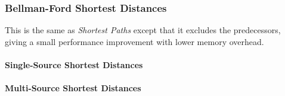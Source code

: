 \subsubsection{Bellman-Ford Shortest Distances}

This is the same as \textit{Shortest Paths} except that it excludes the predecessors,
giving a small performance improvement with lower memory overhead.

\paragraph{Single-Source Shortest Distances}
{\small
      
}

\paragraph{Multi-Source Shortest Distances}
{\small
      
}

